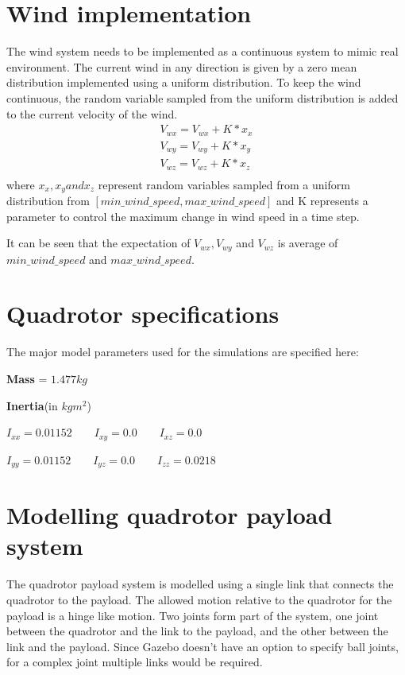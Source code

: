 \documentclass[hidelinks,BTech]{iitmdiss}
\begin{document}
\section{Wind implementation}
The wind system needs to be implemented as a continuous system to mimic real environment. The current wind in any direction is given by a zero mean distribution implemented using a uniform distribution. To keep the wind continuous, the random variable sampled from the uniform distribution is added to the current velocity of the wind.
\begin{equation}
\begin{array}{c}
V_{wx} = V_{wx} + K * x_x\\
V_{wy} = V_{wy} + K * x_y\\
V_{wz} = V_{wz} + K * x_z\\	
\end{array}
\end{equation}
where $x_x, x_y and x_z$ represent random variables sampled from a uniform distribution from $[min\_wind\_speed, max\_wind\_speed]$ and K represents a parameter to control the maximum change in wind speed in a time step.

It can be seen that the expectation of $V_{wx}, V_{wy}$ and $V_{wz}$ is average of $min\_wind\_speed$ and $max\_wind\_speed$.

\section{Quadrotor specifications}
The major model parameters used for the simulations are specified here:

\textbf{Mass} = $1.477 kg$

\textbf{Inertia}(in $kgm^2$)

$I_{xx} = 0.01152 \qquad I_{xy} = 0.0 \qquad I_{xz} = 0.0$

$I_{yy} = 0.01152 \qquad I_{yz} = 0.0 \qquad I_{zz} = 0.0218$

\section{Modelling quadrotor payload system}
The quadrotor payload system is modelled using a single link that connects the quadrotor to the payload. The allowed motion relative to the quadrotor for the payload is a hinge like motion. Two joints form part of the system, one joint between the quadrotor and the link to the payload, and the other between the link and the payload. Since Gazebo doesn't have an option to specify ball joints, for a complex joint multiple links would be required.
\end{document}

